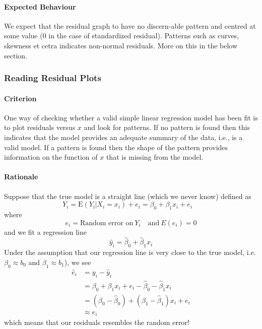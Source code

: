 \documentclass[11pt]{article}
\begin{document}
\paragraph{Expected Behaviour} We expect that the residual graph to have no discern-able pattern and centred at some value (0 in the case of standardized residual). Patterns such as curves, skewness et cetra indicates non-normal residuals. More on this in the below section.

\subsubsection{Reading Residual Plots}
\paragraph{Criterion} One way of checking whether a valid simple linear regression model has been fit is to plot residuals versus $x$ and look for patterns. If no pattern is found then this indicates that the model provides an adequate summary of the data, i.e., is a valid model. If a pattern is found then the shape of the pattern provides information on the function of $x$ that is missing from the model.  

\paragraph{Rationale} Suppose that the true model is a straight line (which we never know) defined as
\begin{equation}
    Y_{i}=\mathrm{E}\left(Y_{\mathrm{i}} | X_{i}=x_{i}\right)+e_{i}=\beta_{0}+\beta_{1} x_{i}+e_{i} \quad 
\end{equation}
where
\begin{equation*}
    e_i = \text{Random error on}~Y_i\quad \text{and} ~E(e_i) = 0
\end{equation*}
and we fit a regression line
\begin{equation*}
    \hat{y}_{i}=\hat{\beta}_{0}+\hat{\beta}_{1} x_{i}
\end{equation*}
Under the assumption that our regression line is very close to the true model, i.e. $\beta_0 \approx b_0$ and $\beta_1 \approx b_1$), we see
\begin{align*}
    \hat{e}_{i} 
    &= y_{i}-\hat{y}_{i} \\
    &= \beta_{0}+\beta_{1} x_{i} + e_i - \hat{\beta}_{0} - \hat{\beta}_{1} x_{i} \\
    &= \left(\beta_{0}-\hat{\beta}_{0}\right)+\left(\beta_{1}-\hat{\beta}_{1}\right) x_{i}+e_{i} \\
    &\approx e_i
\end{align*}
which means that our residuals resembles the random error! 
\end{document}
